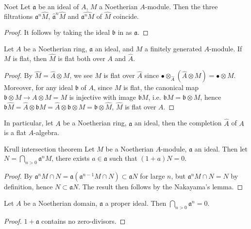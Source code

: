 \documentclass[10pt]{extarticle}
\begin{document}
\begin{corollary}{}{Noet}
    Let $\mathfrak{a}$ be an ideal of $A$, $M$ a Noetherian $A$-module. Then the three filtrations $\mathfrak{a}^n\widehat{M}$, $\widehat{\mathfrak{a}}^n\widehat{M}$ and $\widehat{\mathfrak{a}^nM}$ of $\widehat{M}$ coincide.
\end{corollary}
\begin{proof}
    It follows by taking the ideal $\mathfrak{b}$ in  as $\mathfrak{a}$.
\end{proof}

\begin{corollary}{}{}
    Let $A$ be a Noetherian ring, $\mathfrak{a}$ an ideal, and $M$ a finitely generated $A$-module. If $M$ is flat, then $\widehat{M}$ is flat both over $A$ and $\widehat{A}$.
\end{corollary}
\begin{proof}
    By $\widehat{M}=\widehat{A}\otimes M$, we see $\widehat{M}$ is flat over $\widehat{A}$ since $\bullet\otimes_{\widehat{A}}\left(\widehat{A}\otimes M\right)=\bullet\otimes M$. Moreover, for any ideal $\mathfrak{b}$ of $A$, since $M$ is flat, the canonical map $\mathfrak{b}\otimes M\to A\otimes M=M$ is injective with image $\mathfrak{b}M$, i.e. $\mathfrak{b}M=\mathfrak{b}\otimes M$, hence $\mathfrak{b}\widehat{M}=\widehat{A}\otimes\mathfrak{b}M=\widehat{A}\otimes\mathfrak{b}\otimes M=\mathfrak{b}\otimes\widehat{M}$, $\widehat{M}$ is flat over $A$.
\end{proof}
In particular, let $A$ be a Noetherian ring, $\mathfrak{a}$ an ideal, then the completion $\widehat{A}$ of $A$ is a flat $A$-algebra.

\begin{theorem}{Krull intersection theorem}{} 
Let $M$ be a Noetherian $A$-module, $\mathfrak{a}$ an ideal. Then let $N=\bigcap_{n>0}\mathfrak{a}^nM$, there exists $a\in\mathfrak{a}$ such that $(1+a)N=0$.
\end{theorem}
\begin{proof}
    By  $\mathfrak{a}^nM\cap N=\mathfrak{a}(\mathfrak{a}^{n-1}M\cap N)\subset\mathfrak{a}N$ for large $n$, but $\mathfrak{a}^nM\cap N=N$ by definition, hence $N\subset \mathfrak{a}N$. The result then follows by the Nakayama's lemma.
\end{proof}

\begin{corollary}{}{}
Let $A$ be a Noetherian domain, $\mathfrak{a}$ a proper ideal. Then $\bigcap_{n>0}\mathfrak{a}^n=0$.
\end{corollary}
\begin{proof}
    $1+\mathfrak{a}$ contains no zero-divisors.
\end{proof}
\end{document}
